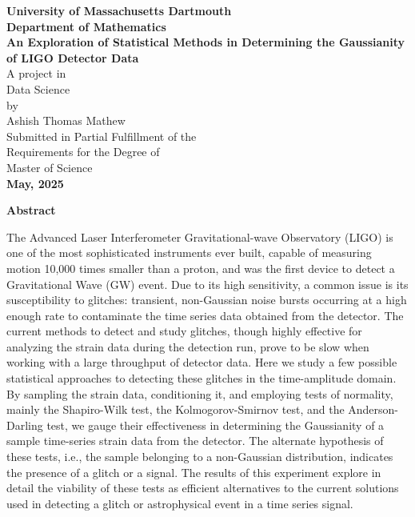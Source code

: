 \documentclass[12pt]{article}
\begin{document}
\begin{titlepage}
  \vspace*{1cm}
  \centering
  {\LARGE \textbf{University of Massachusetts Dartmouth}}\\[1.5cm]
  {\Large \textbf{Department of Mathematics}}\\[2cm]
  {\huge \textbf{An Exploration of Statistical Methods in Determining the Gaussianity of LIGO Detector Data}}\\[3cm]
  {\Large A project in}\\[0.2cm]
  {\Large Data Science}\\[0.2cm]
  {\Large by}\\[0.2cm]
  {\Large Ashish Thomas Mathew}\\[2.5cm]
  {\Large Submitted in Partial Fulfillment of the}\\[0.5cm]
  {\Large Requirements for the Degree of}\\[0.5cm]
  {\Large Master of Science}\\[2cm]
  {\large \textbf{May, 2025}}
  \vfill
\end{titlepage}

\clearpage  %
\normalfont %
\raggedright %

\begin{center}
    \Large \textbf{Abstract}  %
\end{center}

\justifying

\noindent The Advanced Laser Interferometer Gravitational-wave Observatory (LIGO) is one of the most sophisticated instruments ever built, capable of measuring motion 10,000 times smaller than a proton, and was the first device to detect a Gravitational Wave (GW) event. Due to its high sensitivity, a common issue is its susceptibility to glitches: transient, non-Gaussian noise bursts occurring at a high enough rate to contaminate the time series data obtained from the detector. The current methods to detect and study glitches, though highly effective for analyzing the strain data during the detection run, prove to be slow when working with a large throughput of detector data. Here we study a few possible statistical approaches to detecting these glitches in the time-amplitude domain. By sampling the strain data, conditioning it, and employing tests of normality, mainly the Shapiro-Wilk test, the Kolmogorov-Smirnov test, and the Anderson-Darling test, we gauge their effectiveness in determining the Gaussianity of a sample time-series strain data from the detector. The alternate hypothesis of these tests, i.e., the sample belonging to a non-Gaussian distribution, indicates the presence of a glitch or a signal. The results of this experiment explore in detail the viability of these tests as efficient alternatives to the current solutions used in detecting a glitch or astrophysical event in a time series signal.
\end{document}
